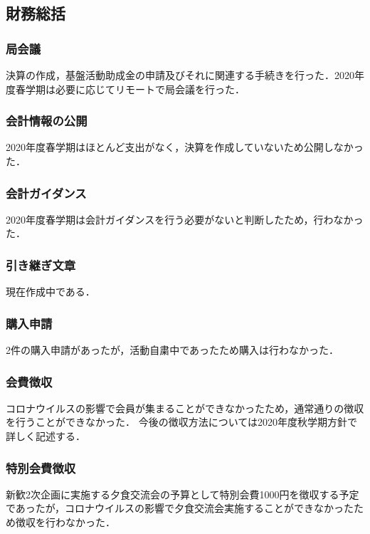\subsection*{財務総括}


\subsubsection*{局会議}
決算の作成，基盤活動助成金の申請及びそれに関連する手続きを行った．2020年度春学期は必要に応じてリモートで局会議を行った．

\subsubsection*{会計情報の公開}
2020年度春学期はほとんど支出がなく，決算を作成していないため公開しなかった．

\subsubsection*{会計ガイダンス}
2020年度春学期は会計ガイダンスを行う必要がないと判断したため，行わなかった．

\subsubsection*{引き継ぎ文章}
現在作成中である．

\subsubsection*{購入申請}
2件の購入申請があったが，活動自粛中であったため購入は行わなかった．

\subsubsection*{会費徴収}
コロナウイルスの影響で会員が集まることができなかったため，通常通りの徴収を行うことができなかった．
今後の徴収方法については2020年度秋学期方針で詳しく記述する．

\subsubsection*{特別会費徴収}
新歓2次企画に実施する夕食交流会の予算として特別会費1000円を徴収する予定であったが，コロナウイルスの影響で夕食交流会実施することができなかったため徴収を行わなかった．

